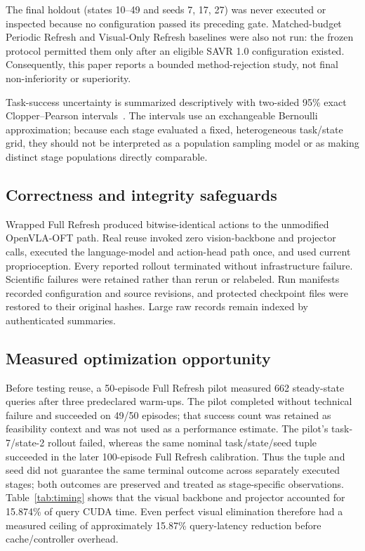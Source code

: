 \documentclass[11pt]{article}
\begin{document}
The final holdout (states 10--49 and seeds 7, 17, 27) was never executed or inspected because no configuration passed its preceding gate. Matched-budget Periodic Refresh and Visual-Only Refresh baselines were also not run: the frozen protocol permitted them only after an eligible SAVR 1.0 configuration existed. Consequently, this paper reports a bounded method-rejection study, not final non-inferiority or superiority.

Task-success uncertainty is summarized descriptively with two-sided 95\% exact Clopper--Pearson intervals~\cite{clopperpearson}. The intervals use an exchangeable Bernoulli approximation; because each stage evaluated a fixed, heterogeneous task/state grid, they should not be interpreted as a population sampling model or as making distinct stage populations directly comparable.

\subsection{Correctness and integrity safeguards}

Wrapped Full Refresh produced bitwise-identical actions to the unmodified OpenVLA-OFT path. Real reuse invoked zero vision-backbone and projector calls, executed the language-model and action-head path once, and used current proprioception. Every reported rollout terminated without infrastructure failure. Scientific failures were retained rather than rerun or relabeled. Run manifests recorded configuration and source revisions, and protected checkpoint files were restored to their original hashes. Large raw records remain indexed by authenticated summaries.

\subsection{Measured optimization opportunity}

Before testing reuse, a 50-episode Full Refresh pilot measured 662 steady-state queries after three predeclared warm-ups. The pilot completed without technical failure and succeeded on 49/50 episodes; that success count was retained as feasibility context and was not used as a performance estimate. The pilot's task-7/state-2 rollout failed, whereas the same nominal task/state/seed tuple succeeded in the later 100-episode Full Refresh calibration. Thus the tuple and seed did not guarantee the same terminal outcome across separately executed stages; both outcomes are preserved and treated as stage-specific observations. Table~\ref{tab:timing} shows that the visual backbone and projector accounted for 15.874\% of query CUDA time. Even perfect visual elimination therefore had a measured ceiling of approximately 15.87\% query-latency reduction before cache/controller overhead.
\end{document}
